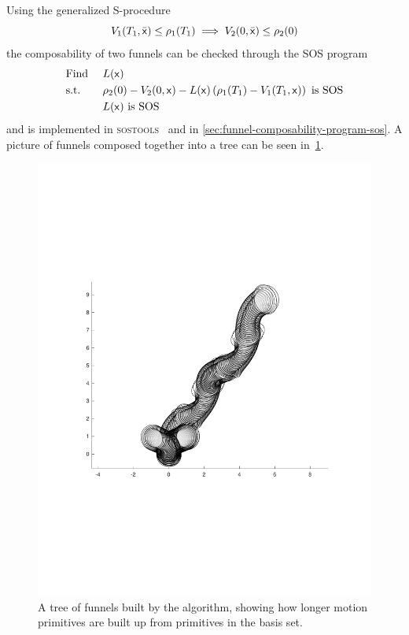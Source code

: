 Using the generalized S-procedure
\begin{equation}
  V_1(T_1,\bar{{\mathbf{\mathsf{x}}}}) \leq \rho_1(T_1) \implies V_2(0, \bar{{\mathbf{\mathsf{x}}}}) \leq \rho_2(0)
\end{equation}
the composability of two funnels can be checked through the \ac{SOS} program
\begin{align}
  & \text{Find } && L({\mathbf{\mathsf{x}}}) \\
  & \text{s.t. } && \rho_2(0) - V_2(0,{\mathbf{\mathsf{x}}}) - L({\mathbf{\mathsf{x}}})\left( \rho_1(T_1) - V_1(T_1,{\mathbf{\mathsf{x}}}) \right) \text{ is SOS} \nonumber \\ 
  &&& L({\mathbf{\mathsf{x}}}) \text{ is SOS} \nonumber
\end{align}
and is implemented in \textsc{sostools}~\cite{sostools} and \matlab{} in
\cref{sec:funnel-composability-program-sos}. A picture of funnels composed
together into a tree can be seen in~\cref{fig:funnel-composition-tree}.
\begin{figure}
  \centering \includegraphics[scale=.5, trim={0cm 7cm 0cm
    7cm}]{figures/method/funnel-tree} \caption[A tree of funnels built by the
  \rrtfunnel{} algorithm]{A tree of funnels built by the \rrtfunnel{} algorithm,
    showing how longer motion primitives are built up from primitives in the
    basis set.}
  \label{fig:funnel-composition-tree}
\end{figure}


